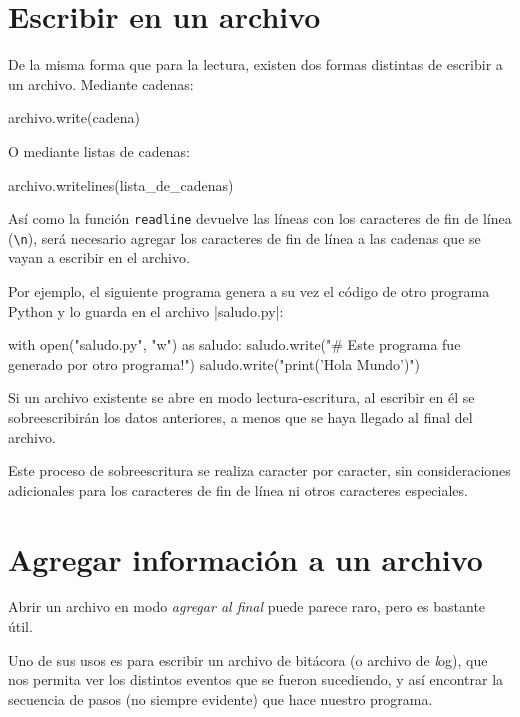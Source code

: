 \section{Escribir en un archivo}

De la misma forma que para la lectura, existen dos formas distintas de
escribir a un archivo.  Mediante cadenas:

\begin{codigo-python-sn}
archivo.write(cadena)
\end{codigo-python-sn}

O mediante listas de cadenas:

\begin{codigo-python-sn}
archivo.writelines(lista_de_cadenas)
\end{codigo-python-sn}

Así como la función \lstinline!readline! devuelve las líneas con los caracteres
de fin de línea (\lstinline!\n!), será necesario agregar los caracteres de
fin de línea a las cadenas que se vayan a escribir en el archivo.

Por ejemplo, el siguiente programa genera a su vez el código de otro programa
Python y lo guarda en el archivo |saludo.py|:

\begin{codigo-python-sn}
with open("saludo.py", "w") as saludo:
    saludo.write("# Este programa fue generado por otro programa!\n")
    saludo.write("print('Hola Mundo')\n")
\end{codigo-python-sn}

\begin{atencion}
Si un archivo existente se abre en modo lectura-escritura, al escribir en
él se sobreescribirán los datos anteriores, a menos que se haya llegado al
final del archivo.

Este proceso de sobreescritura se realiza caracter por caracter, sin
consideraciones adicionales para los caracteres de fin de línea ni otros
caracteres especiales.
\end{atencion}

\section{Agregar información a un archivo}

Abrir un archivo en modo \emph{agregar al final} puede parece raro,
pero es bastante útil.

Uno de sus usos es para escribir un archivo de bitácora (o archivo de
{\textit log}), que nos permita ver los distintos eventos que se fueron
sucediendo, y así encontrar la secuencia de pasos (no siempre evidente) que
hace nuestro programa.


